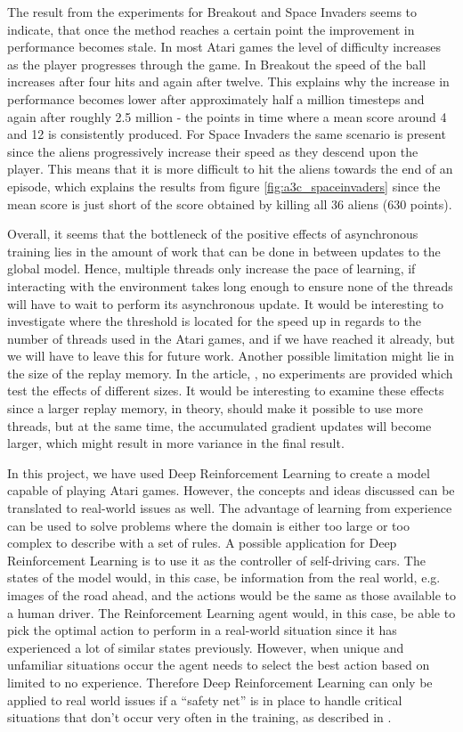 \documentclass[11pt]{article}
\begin{document}
The result from the experiments for Breakout and Space Invaders
seems to indicate, that once the method reaches a certain point
the improvement in performance becomes stale.
In most Atari games the level of difficulty increases as the
player progresses through the game.
In Breakout the speed of the ball increases after
four hits and again after twelve.
This explains why the increase in performance becomes lower after
approximately half a million timesteps and again after
roughly 2.5 million - the points in time where a mean score around 4 and 12
is consistently produced.
For Space Invaders the same scenario is present since
the aliens progressively increase their speed as they
descend upon the player.
This means that it is more difficult to hit the aliens towards the end of an episode,
which explains the results from figure \ref{fig:a3c_spaceinvaders}
since the mean score is just short of the score obtained by killing all 36 aliens (630 points).

Overall,
it seems that the bottleneck of the positive effects of asynchronous training
lies in the amount of work that can be done in between updates to the global model.
Hence, multiple threads only increase the pace of learning, if
interacting with the environment takes long enough to ensure
none of the threads will have to wait to perform
its asynchronous update.
It would be interesting to investigate where the threshold is located
for the speed up in regards to the number of threads used in the Atari games,
and if we have reached it already, but we will have to leave this for future work.
Another possible limitation might lie in the size of the replay memory.
In the article, \cite{a3c}, no experiments are provided which test
the effects of different sizes.
It would be interesting to examine these effects since a larger replay memory,
in theory, should make it possible to use more threads, but at the same time,
the accumulated gradient updates will become larger, which might result in
more variance in the final result.

In this project, we have used Deep Reinforcement Learning to
create a model capable of playing Atari games.
However, the concepts and ideas discussed can be translated to real-world
issues as well.
The advantage of learning from experience can be used to solve problems where the
domain is either too large or too complex to
describe with a set of rules.
A possible application for Deep Reinforcement Learning is
to use it as the controller of self-driving cars.
The states of the model would, in this case, be information
from the real world, e.g. images of the road ahead, 
and the actions would be the same as those available to
a human driver.
The Reinforcement Learning agent would, in this case, be able to pick the
optimal action to perform in a real-world situation since
it has experienced a lot of similar states previously.
However, when unique and unfamiliar situations occur 
the agent needs to select the best action based on limited to no
experience.
Therefore Deep Reinforcement Learning can only be applied
to real world issues if a “safety net” is in place
to handle critical situations that don't occur
very often in the training, as described in \cite{BILER}.
\end{document}
